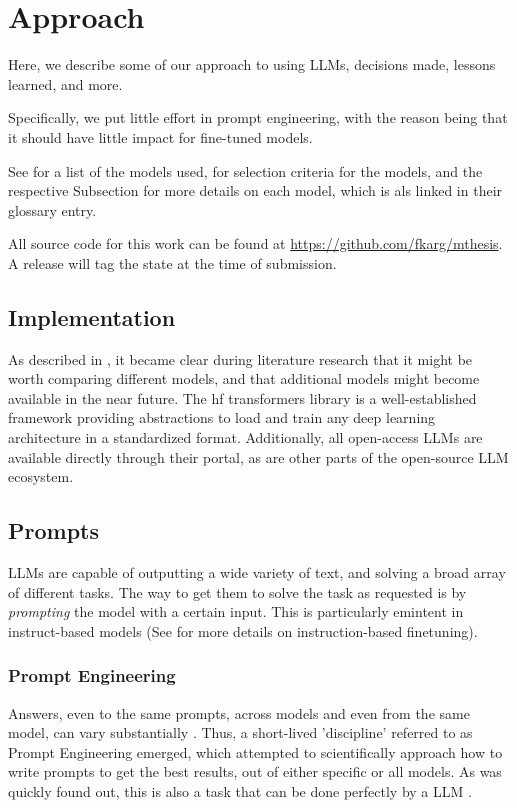 \chapter{Approach}\label{chap:approach}
Here, we describe some of our approach to using \glspl{LLM}, decisions made, lessons learned, and more.

Specifically, we put little effort in prompt engineering, with the reason being that it should have little impact for fine-tuned models.

See  for a list of the models used,  for selection criteria for the models, and the respective Subsection for more details on each model, which is als linked in their glossary entry.

All source code for this work can be found at \url{https://github.com/fkarg/mthesis}.
A release will tag the state at the time of submission.

\section{Implementation}\label{sec:impl}
As described in , it became clear during literature research that it might be worth comparing different models, and that additional models might become available in the near future.
The \gls{hf} \gls{transformers} library is a well-established framework providing abstractions to load and train any deep learning architecture in a standardized format.
Additionally, all open-access \glspl{LLM} are available directly through their portal, as are other parts of the open-source \gls{LLM} ecosystem.


\section{Prompts}\label{sec:prompts}
\glspl{LLM} are capable of outputting a wide variety of text, and solving a broad array of different tasks.
The way to get them to solve the task as requested is by {\em prompting} the model with a certain input.
This is particularly emintent in instruct-based models (See  for more details on instruction-based finetuning).

\subsection{Prompt Engineering}\label{sub:engineering}
Answers, even to the same prompts, across models and even from the same model, can vary substantially \cite{chen_how_2023}.
Thus, a short-lived 'discipline' referred to as Prompt Engineering emerged, which attempted to scientifically approach how to write prompts to get the best results, out of either specific or all models.
As was quickly found out, this is also a task that can be done perfectly by a \gls{LLM} \cite{zhou_large_2022}.

